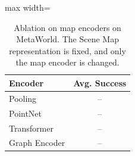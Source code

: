 \begin{table}[t]
\centering
\caption{Ablation on map encoders on MetaWorld. The Scene Map representation is fixed, and only the map encoder is changed.}
\label{tab:ablation_encoder}
\small
\setlength{\tabcolsep}{10pt}
\begin{adjustbox}{max width=\columnwidth}
\begin{tabular}{l|c}
\toprule
Encoder & Avg. Success \\
\midrule
Pooling & -- \\
PointNet & -- \\
Transformer & -- \\
Graph Encoder & -- \\
\bottomrule
\end{tabular}
\end{adjustbox}
\end{table}

